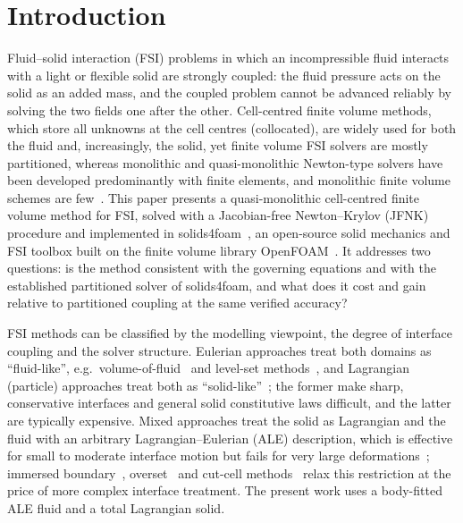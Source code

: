 \section{Introduction}\label{sec:intro}
Fluid--solid interaction (FSI) problems in which an incompressible fluid interacts with a light or flexible solid are strongly coupled: the fluid pressure acts on the solid as an added mass, and the coupled problem cannot be advanced reliably by solving the two fields one after the other.
Cell-centred finite volume methods, which store all unknowns at the cell centres (collocated), are widely used for both the fluid and, increasingly, the solid, yet finite volume FSI solvers are mostly partitioned, whereas monolithic and quasi-monolithic Newton-type solvers have been developed predominantly with finite elements, and monolithic finite volume schemes are few~\citep{Eken2016, Eken2017, Tandis2023}.
This paper presents a quasi-monolithic cell-centred finite volume method for FSI, solved with a Jacobian-free Newton--Krylov (JFNK) procedure and implemented in solids4foam~\citep{Cardiff2025}, an open-source solid mechanics and FSI toolbox built on the finite volume library OpenFOAM~\citep{Weller1998}.
It addresses two questions: is the method consistent with the governing equations and with the established partitioned solver of solids4foam, and what does it cost and gain relative to partitioned coupling at the same verified accuracy?

FSI methods can be classified by the modelling viewpoint, the degree of interface coupling and the solver structure.
Eulerian approaches treat both domains as ``fluid-like'', e.g.\ volume-of-fluid~\citep{jain2019conservative} and level-set methods~\citep{dunne2006eulerian, cottet2008eulerian}, and Lagrangian (particle) approaches treat both as ``solid-like''~\citep{aubry2005particle, aubry2006fractional, cremonesi2020state}; the former make sharp, conservative interfaces and general solid constitutive laws difficult, and the latter are typically expensive.
Mixed approaches treat the solid as Lagrangian and the fluid with an arbitrary Lagrangian--Eulerian (ALE) description, which is effective for small to moderate interface motion but fails for very large deformations~\citep{wall2006large}; immersed boundary~\citep{peskin1977numerical, peskin2002immersed, iaccarino2003immersed}, overset~\citep{ge2003three, miller2014overset, li2021fluid, cane2021patient} and cut-cell methods~\citep{pasquariello2016cut, tao2020new, xie2020cartesian} relax this restriction at the price of more complex interface treatment.
The present work uses a body-fitted ALE fluid and a total Lagrangian solid.


